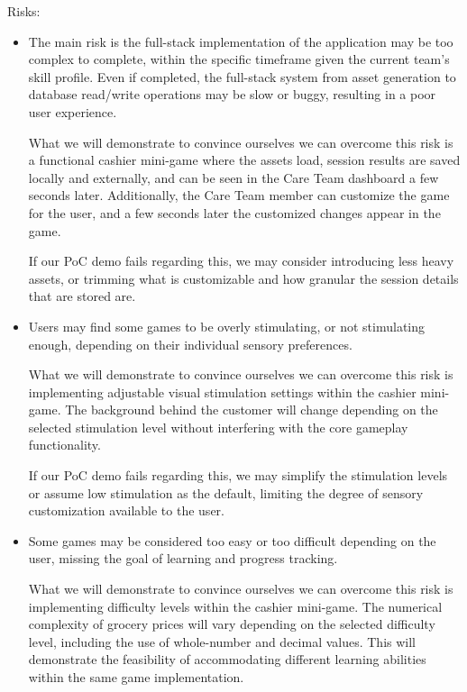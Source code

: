 \documentclass{article}
\begin{document}
\medskip
\noindent Risks:
\begin{itemize}
  \item The main risk is the full-stack implementation of the application may be too complex to complete, within the specific timeframe given the current team's skill profile. Even if completed, the full-stack system from asset generation to database read/write operations may be slow or buggy, resulting in a poor user experience.
  
  What we will demonstrate to convince ourselves we can overcome this risk is a functional cashier mini-game where the assets load, session results are saved locally and externally, and can be seen in the Care Team dashboard a few seconds later. Additionally, the Care Team member can customize the game for the user, and a few seconds later the customized changes appear in the game.

  If our PoC demo fails regarding this, we may consider introducing less heavy assets, or trimming what is customizable and how granular the session details that are stored are.

  \item Users may find some games to be overly stimulating, or not stimulating enough, depending on their individual sensory preferences.

  What we will demonstrate to convince ourselves we can overcome this risk is implementing adjustable visual stimulation settings within the cashier mini-game. The background behind the customer will change depending on the selected stimulation level without interfering with the core gameplay functionality.

  If our PoC demo fails regarding this, we may simplify the stimulation levels or assume low stimulation as the default, limiting the degree of sensory customization available to the user.

  \item Some games may be considered too easy or too difficult depending on the user, missing the goal of learning and progress tracking.

  What we will demonstrate to convince ourselves we can overcome this risk is implementing difficulty levels within the cashier mini-game. The numerical complexity of grocery prices will vary depending on the selected difficulty level, including the use of whole-number and decimal values. This will demonstrate the feasibility of accommodating different learning abilities within the same game implementation.


\end{itemize}
\end{document}
